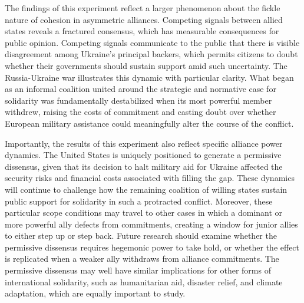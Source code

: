 
The findings of this experiment reflect a larger phenomenon about the fickle nature of cohesion in asymmetric alliances. Competing signals between allied states reveals a fractured consensus, which has measurable consequences for public opinion. Competing signals communicate to the public that there is visible disagreement among Ukraine's principal backers, which permits citizens to doubt whether their governments should sustain support amid such uncertainty. The Russia-Ukraine war illustrates this dynamic with particular clarity. What began as an informal coalition united around the strategic and normative case for solidarity was fundamentally destabilized when its most powerful member withdrew, raising the costs of commitment and casting doubt over whether European military assistance could meaningfully alter the course of the conflict.

Importantly, the results of this experiment also reflect specific alliance power dynamics. The United States is uniquely positioned to generate a permissive dissensus, given that its decision to halt military aid for Ukraine affected the security risks and financial costs associated with filling the gap. These dynamics will continue to challenge how the remaining coalition of willing states sustain public support for solidarity in such a protracted conflict. Moreover, these particular scope conditions may travel to other cases in which a dominant or more powerful ally defects from commitments, creating a window for junior allies to either step up or step back. Future research should examine whether the permissive dissensus requires hegemonic power to take hold, or whether the effect is replicated when a weaker ally withdraws from alliance commitments. The permissive dissensus may well have similar implications for other forms of international solidarity, such as humanitarian aid, disaster relief, and climate adaptation, which are equally important to study. 

